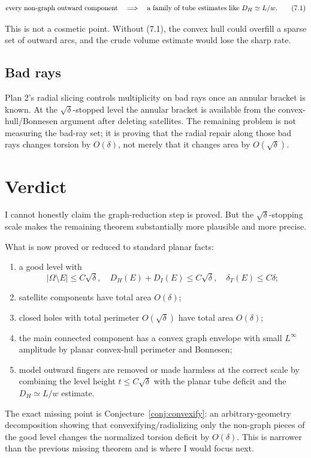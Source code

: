 \documentclass[11pt]{article}
\newcommand{\Om}{\Omega}
\newcommand{\dT}{\delta_T}
\begin{document}
\[
   \hbox{every non-graph outward component}
      \quad\Longrightarrow\quad
   \hbox{a family of tube estimates like }D_H\simeq L/w.
   \tag{7.1}
\]

This is not a cosmetic point.  Without (7.1), the convex hull could overfill a
sparse set of outward arcs, and the crude volume estimate would lose the sharp
rate.

\subsection{Bad rays}

Plan 2's radial slicing controls multiplicity on bad rays once an annular
bracket is known.  At the \(\sqrt\delta\)-stopped level the annular bracket is
available from the convex-hull/Bonnesen argument after deleting satellites.
The remaining problem is not measuring the bad-ray set; it is proving that the
radial repair along those bad rays changes torsion by \(O(\delta)\), not merely
that it changes area by \(O(\sqrt\delta)\).

\section{Verdict}

I cannot honestly claim the graph-reduction step is proved.  But the
\(\sqrt\delta\)-stopping scale makes the remaining theorem substantially more
plausible and more precise.

What is now proved or reduced to standard planar facts:
\begin{enumerate}[label=\arabic*.]
\item a good level with
\[
   |\Om\setminus E|\le C\sqrt\delta,\quad
   D_H(E)+D_I(E)\le C\sqrt\delta,\quad
   \dT(E)\le C\delta;
\]
\item satellite components have total area \(O(\delta)\);
\item closed holes with total perimeter \(O(\sqrt\delta)\) have total area
\(O(\delta)\);
\item the main connected component has a convex graph envelope with small
\(L^\infty\) amplitude by planar convex-hull perimeter and Bonnesen;
\item model outward fingers are removed or made harmless at the correct scale
by combining the level height \(t\le C\sqrt\delta\) with the planar tube
deficit and the \(D_H\simeq L/w\) estimate.
\end{enumerate}

The exact missing point is Conjecture~\ref{conj:convexify}: an
arbitrary-geometry decomposition showing that convexifying/radializing only
the non-graph pieces of the good level changes the normalized torsion deficit
by \(O(\delta)\).  This is narrower than the previous missing theorem and is
where I would focus next.
\end{document}
